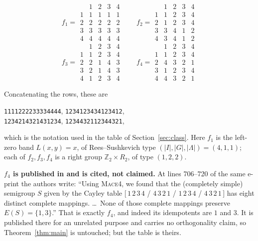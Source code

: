 \documentclass[11pt]{amsart}
\theoremstyle{remark}
\theoremstyle{definition}
\begin{document}
\[
f_1=\begin{array}{c|cccc} & 1&2&3&4\\\hline 1&1&1&1&1\\ 2&2&2&2&2\\ 3&3&3&3&3\\ 4&4&4&4&4
\end{array}
\qquad
f_2=\begin{array}{c|cccc} & 1&2&3&4\\\hline 1&1&2&3&4\\ 2&1&2&3&4\\ 3&3&4&1&2\\ 4&3&4&1&2
\end{array}
\]
\[
f_3=\begin{array}{c|cccc} & 1&2&3&4\\\hline 1&1&2&3&4\\ 2&2&1&4&3\\ 3&2&1&4&3\\ 4&1&2&3&4
\end{array}
\qquad
f_4=\begin{array}{c|cccc} & 1&2&3&4\\\hline 1&1&2&3&4\\ 2&4&3&2&1\\ 3&1&2&3&4\\ 4&4&3&2&1
\end{array}
\]

Concatenating the rows, these are
\begin{center}
\texttt{1111222233334444},\quad
\texttt{1234123434123412},\\
\texttt{1234214321431234},\quad
\texttt{1234432112344321},
\end{center}
which is the notation used in the table of Section~\ref{sec:class}. Here $f_1$ is the left-zero band
$L(x,y)=x$, of Rees--Sushkevich type $(|I|,|G|,|\Lambda|)=(4,1,1)$; each of $f_2,f_3,f_4$ is a right
group $\mathbb Z_2\times R_2$, of type $(1,2,2)$.

\medskip
\noindent\textbf{$f_4$ is published in \cite{ABCHK} and is cited, not claimed.} At lines 706--720 of
the same e-print the authors write:
``Using \textsc{Mace4}, we found that the (completely simple) semigroup $S$ given by the Cayley
table [\,$1\,2\,3\,4$ / $4\,3\,2\,1$ / $1\,2\,3\,4$ / $4\,3\,2\,1$\,] has eight distinct complete
mappings. \dots\ None of those complete mappings preserve $E(S)=\{1,3\}$.'' That is exactly $f_4$,
and indeed its idempotents are $1$ and $3$. It is published there for an unrelated purpose and
carries no orthogonality claim, so Theorem~\ref{thm:main} is untouched; but the table is theirs.
\end{document}

